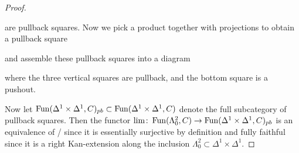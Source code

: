 \begin{lemma}
\begin{proof}
\begin{center}
        \end{center}
        are pullback squares.
        Now we pick a product together with projections to obtain a pullback square 
        \begin{center}
        \end{center}
        and assemble these pullback squares into a diagram
        \begin{center}
        \end{center}
        where the three vertical squares are pullback, and the bottom square is a pushout.

        Now let $\operatorname{Fun}(\Delta^1\times\Delta^1,C)_{pb}\subset\operatorname{Fun}(\Delta^1\times\Delta^1,C)$ denote the full subcategory of pullback squares.
        Then the functor $\lim\colon\operatorname{Fun}(\Lambda_0^2,C)\to\operatorname{Fun}(\Delta^1\times\Delta^1,C)_{pb}$ is an equivalence of \inftycats/ since it is essentially surjective by definition and fully faithful since it is a right Kan-extension along the inclusion $\Lambda_0^2\subset\Delta^1\times\Delta^1$.


\end{proof}
\end{lemma}
